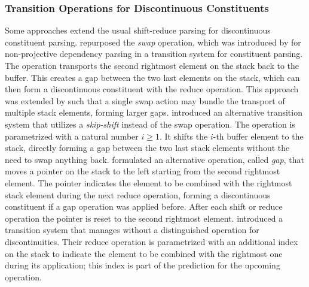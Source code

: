 \documentclass[../document.tex]{subfiles}
\begin{document}
    \subsubsection*{Transition Operations for Discontinuous Constituents}
    Some approaches extend the usual shift-reduce parsing for discontinuous constituent parsing.
     repurposed the \emph{swap} operation, which was introduced by \citet{Nivre09} for non-projective dependency parsing in a transition system for constituent parsing.
    The operation transports the second rightmost element on the stack back to the buffer.
    This creates a gap between the two last elements on the stack, which can then form a discontinuous constituent with the reduce operation.
    This approach was extended by \citet{Maier15} such that a single swap action may bundle the transport of multiple stack elements, forming larger gaps.
     introduced an alternative transition system that utilizes a \emph{skip-shift} instead of the swap operation.
    The operation is parametrized with a natural number \(i \ge 1\). It shifts the \(i\)-th buffer element to the stack, directly forming a gap between the two last stack elements without the need to swap anything back.
     formulated an alternative operation, called \emph{gap}, that moves a pointer on the stack to the left starting from the second rightmost element.
    The pointer indicates the element to be combined with the rightmost stack element during the next reduce operation, forming a discontinuous constituent if a gap operation was applied before.
    After each shift or reduce operation the pointer is reset to the second rightmost element.
     introduced a transition system that manages without a distinguished operation for discontinuities.
    Their reduce operation is parametrized with an additional index on the stack to indicate the element to be combined with the rightmost one during its application; this index is part of the prediction for the upcoming operation.
\end{document}
